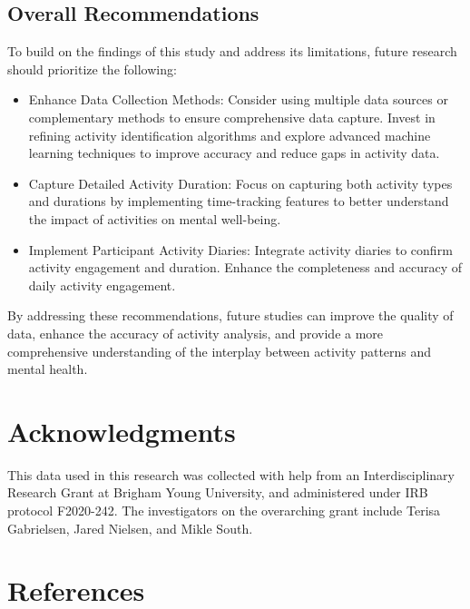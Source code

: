 \documentclass[
  letterpaper,
  number,
  review,
  3p]{elsarticle}
\begin{document}
\subsection{Overall Recommendations}\label{overall-recommendations}

To build on the findings of this study and address its limitations,
future research should prioritize the following:

\begin{itemize}
\item
  Enhance Data Collection Methods: Consider using multiple data sources
  or complementary methods to ensure comprehensive data capture. Invest
  in refining activity identification algorithms and explore advanced
  machine learning techniques to improve accuracy and reduce gaps in
  activity data.
\item
  Capture Detailed Activity Duration: Focus on capturing both activity
  types and durations by implementing time-tracking features to better
  understand the impact of activities on mental well-being.
\item
  Implement Participant Activity Diaries: Integrate activity diaries to
  confirm activity engagement and duration. Enhance the completeness and
  accuracy of daily activity engagement.
\end{itemize}

By addressing these recommendations, future studies can improve the
quality of data, enhance the accuracy of activity analysis, and provide
a more comprehensive understanding of the interplay between activity
patterns and mental health.


\section*{Acknowledgments}\label{acknowledgments}


This data used in this research was collected with help from an
Interdisciplinary Research Grant at Brigham Young University, and
administered under IRB protocol F2020-242. The investigators on the
overarching grant include Terisa Gabrielsen, Jared Nielsen, and Mikle
South.


\section*{References}\label{references}
\end{document}
